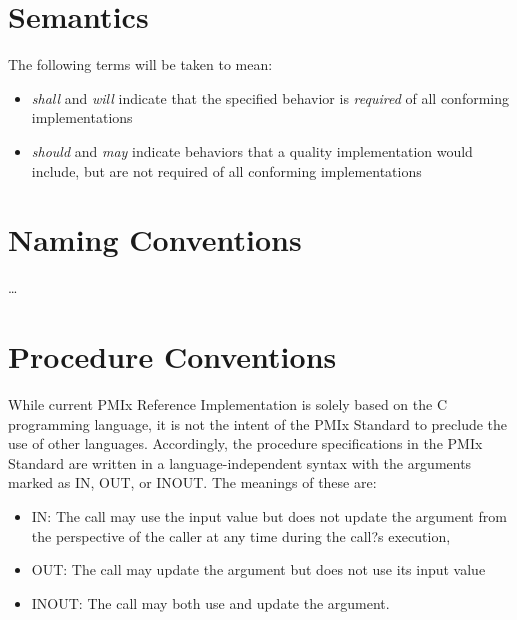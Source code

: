 \section{Semantics}

The following terms will be taken to mean:

\begin{itemize}
\item \emph{shall} and \emph{will} indicate that the specified behavior is \emph{required} of all conforming implementations
\item \emph{should} and \emph{may} indicate behaviors that a quality implementation would include, but are not required of all conforming implementations
\end{itemize}

\section{Naming Conventions}

\ldots

\section{Procedure Conventions}

While current \ac{PMIx} Reference Implementation is solely based on the C programming language, it is not the intent of the \ac{PMIx} Standard to preclude the use of other languages.
Accordingly, the procedure specifications in the \ac{PMIx} Standard are written in a language-independent syntax with the arguments marked as IN, OUT, or INOUT.
The meanings of these are:
\begin{itemize}
\item IN:
The call may use the input value but does not update the argument from the perspective of the caller at any time during the call?s execution, 
\item OUT:
The call may update the argument but does not use its input value
\item INOUT:
The call may both use and update the argument. 
\end{itemize}

